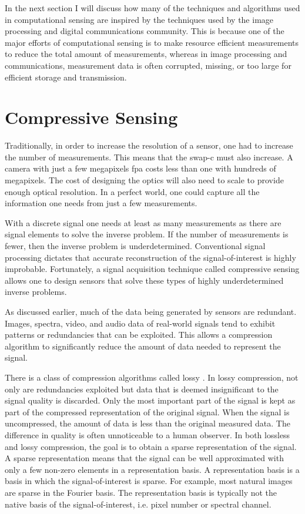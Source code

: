 In the next section I will discuss how many of the techniques and algorithms used in computational sensing are inspired by the techniques used by the image processing and digital communications community. This is because one of the major efforts of computational sensing is to make resource efficient measurements to reduce the total amount of measurements, whereas in image processing and communications, measurement data is often corrupted, missing, or too large for efficient storage and transmission.

\section{Compressive Sensing}\label{sec:multiplexingtocompressivesensing}

Traditionally, in order to increase the resolution of a sensor, one had to increase the number of measurements. This means that the \gls{swap-c} must also increase. A camera with just a few megapixels \gls{fpa} costs less than one with hundreds of megapixels. The cost of designing the optics will also need to scale to provide enough optical resolution. In a perfect world, one could capture all the information one needs from just a few measurements.

With a discrete signal one needs at least as many measurements as there are signal elements to solve the inverse problem. If the number of measurements is fewer, then the inverse problem is underdetermined. Conventional signal processing dictates that accurate reconstruction of the signal-of-interest is highly improbable. Fortunately, a signal acquisition technique called \gls{compressive sensing} allows one to design sensors that solve these types of highly underdetermined inverse problems.

As discussed earlier, much of the data being generated by sensors are redundant. Images, spectra, video, and audio data of real-world signals tend to exhibit patterns or redundancies that can be exploited. This allows a compression algorithm to significantly reduce the amount of data needed to represent the signal. 

There is a class of compression algorithms called lossy \cite{usevitch2001tutorial}. In lossy compression, not only are redundancies exploited but data that is deemed insignificant to the signal quality is discarded. Only the most important part of the signal is kept as part of the compressed representation of the original signal. When the signal is uncompressed, the amount of data is less than the original measured data. The difference in quality is often unnoticeable to a human observer. In both lossless and lossy compression, the goal is to obtain a \gls{sparse} representation of the signal. A sparse representation means that the signal can be well approximated with only a few non-zero elements in a representation basis. A representation basis is a basis in which the signal-of-interest is sparse. For example, most natural images are sparse in the Fourier basis. The representation basis is typically not the native basis of the signal-of-interest, i.e. pixel number or spectral channel.

